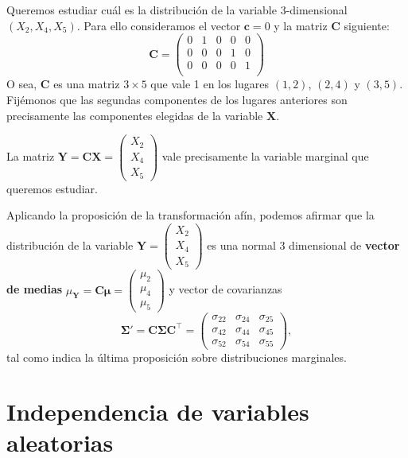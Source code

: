 \documentclass[]{book}
\begin{document}
Queremos estudiar cuál es la distribución de la variable \(3\)-dimensional \((X_2,X_4,X_5)\). Para ello consideramos el vector \(\mathbf{c}=0\) y la matriz \(\mathbf{C}\) siguiente:
\[
\mathbf{C}=\begin{pmatrix}
0 & 1 & 0 & 0 & 0 \\
0 & 0 & 0 & 1 & 0 \\
0 & 0 & 0 & 0 & 1 \\
\end{pmatrix}
\]
O sea, \(\mathbf{C}\) es una matriz \(3\times 5\) que vale 1 en los lugares \((1,2)\), \((2,4)\) y \((3,5)\). Fijémonos que las segundas componentes de los lugares anteriores son precisamente las componentes elegidas de la variable \(\mathbf{X}\).

La matriz \(\mathbf{Y}=\mathbf{C}\mathbf{X}=\begin{pmatrix}X_2\\X_4\\X_5\end{pmatrix}\) vale precisamente la variable marginal que queremos estudiar.

Aplicando la proposición de la transformación afín, podemos afirmar que la distribución de la variable \(\mathbf{Y}=\begin{pmatrix}X_2\\X_4\\X_5\end{pmatrix}\) es una normal \(3\) dimensional de \textbf{vector de medias} \(\mu_{\mathbf{Y}}=\mathbf{C}\mathbf{\mu}=\begin{pmatrix}\mu_2\\\mu_4\\\mu_5\end{pmatrix}\) y vector de covarianzas
\[
\mathbf{\Sigma'}=\mathbf{C}\mathbf{\Sigma}\mathbf{C}^\top = \begin{pmatrix}\sigma_{22} & \sigma_{24} & \sigma_{25}\\ \sigma_{42} & \sigma_{44} & \sigma_{45} \\  \sigma_{52} & \sigma_{54} & \sigma_{55}\end{pmatrix}, 
\]
tal como indica la última proposición sobre distribuciones marginales.

\hypertarget{independencia-de-variables-aleatorias-1}{%
\section{Independencia de variables aleatorias}\label{independencia-de-variables-aleatorias-1}}
\end{document}
